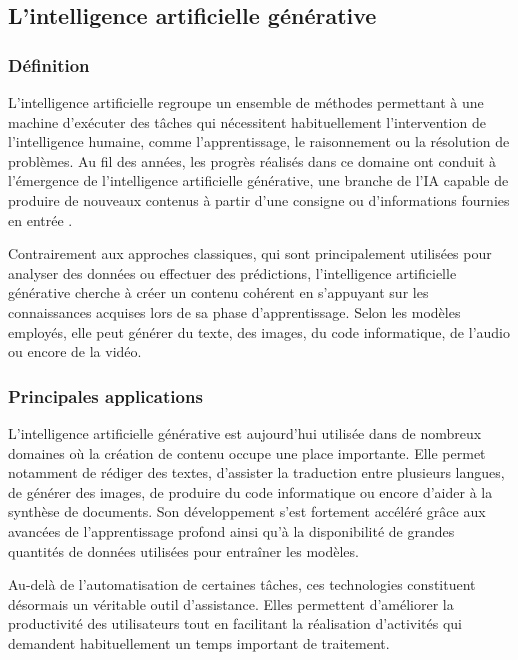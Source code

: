 \subsection{L'intelligence artificielle générative}

\subsubsection{Définition}

L'intelligence artificielle regroupe un ensemble de méthodes permettant à une machine d'exécuter des tâches qui nécessitent habituellement l'intervention de l'intelligence humaine, comme l'apprentissage, le raisonnement ou la résolution de problèmes. Au fil des années, les progrès réalisés dans ce domaine ont conduit à l'émergence de l'intelligence artificielle générative, une branche de l'IA capable de produire de nouveaux contenus à partir d'une consigne ou d'informations fournies en entrée .

Contrairement aux approches classiques, qui sont principalement utilisées pour analyser des données ou effectuer des prédictions, l'intelligence artificielle générative cherche à créer un contenu cohérent en s'appuyant sur les connaissances acquises lors de sa phase d'apprentissage. Selon les modèles employés, elle peut générer du texte, des images, du code informatique, de l'audio ou encore de la vidéo.

\subsubsection{Principales applications}

L'intelligence artificielle générative est aujourd'hui utilisée dans de nombreux domaines où la création de contenu occupe une place importante. Elle permet notamment de rédiger des textes, d'assister la traduction entre plusieurs langues, de générer des images, de produire du code informatique ou encore d'aider à la synthèse de documents. Son développement s'est fortement accéléré grâce aux avancées de l'apprentissage profond ainsi qu'à la disponibilité de grandes quantités de données utilisées pour entraîner les modèles.

Au-delà de l'automatisation de certaines tâches, ces technologies constituent désormais un véritable outil d'assistance. Elles permettent d'améliorer la productivité des utilisateurs tout en facilitant la réalisation d'activités qui demandent habituellement un temps important de traitement.

